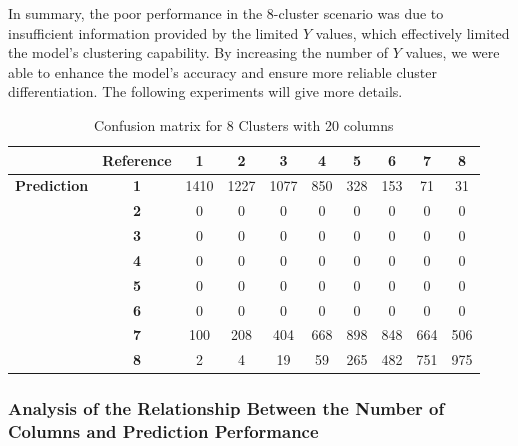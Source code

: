 \documentclass{article}
\begin{document}
In summary, the poor performance in the 8-cluster scenario was due to insufficient information provided by the limited \(Y\) values, which effectively limited the model's clustering capability. By increasing the number of \(Y\) values, we were able to enhance the model's accuracy and ensure more reliable cluster differentiation.
The following experiments will give more details.


\begin{table}[htbp!]
  \centering


  \begin{minipage}{0.8\textwidth}
    \centering
    \begin{tabular}{c|c|c|c|c|c|c|c|c|c}
      & \textbf{Reference} & \textbf{1} & \textbf{2} & \textbf{3} & \textbf{4} & \textbf{5} & \textbf{6} & \textbf{7} & \textbf{8} \\
      \hline
      \textbf{Prediction} & \textbf{1} & 1410 & 1227 & 1077 & 850 & 328 & 153 & 71 & 31 \\
                          & \textbf{2} & 0 & 0 & 0 & 0 & 0 & 0 & 0 & 0 \\
                          & \textbf{3} & 0 & 0 & 0 & 0 & 0 & 0 & 0 & 0 \\
                          & \textbf{4} & 0 & 0 & 0 & 0 & 0 & 0 & 0 & 0 \\
                          & \textbf{5} & 0 & 0 & 0 & 0 & 0 & 0 & 0 & 0 \\
                          & \textbf{6} & 0 & 0 & 0 & 0 & 0 & 0 & 0 & 0 \\
                          & \textbf{7} & 100 & 208 & 404 & 668 & 898 & 848 & 664 & 506 \\
                          & \textbf{8} & 2 & 4 & 19 & 59 & 265 & 482 & 751 & 975 \\
    \end{tabular}
    \caption{Confusion matrix for 8 Clusters with 20 columns}
    \label{tab:8_clu}
  \end{minipage}

\end{table}

\clearpage

\subsubsection{Analysis of the Relationship Between the Number of Columns and Prediction Performance}
\end{document}
